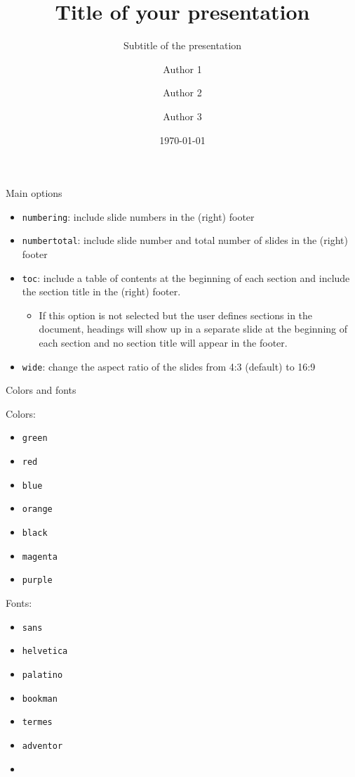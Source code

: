 \documentclass[numbertotal,toc,wide]{../bpslides}
\title{Title of your presentation}
\subtitle{Subtitle of the presentation}
\author{Author 1\inst{1} \and Author 2\inst{2} \and Author 3\inst{3}}
\institute{\inst{1} Institution 1, \  \inst{2} Institution 2, \  \inst{3} Institution 3}
\date{\today}
\begin{document}
\begin{frame}[plain]
	\titlepage
\end{frame}

\begin{frame}{Main options}\label{firstslide}
	\begin{itemize}
		\item \texttt{numbering}: include slide numbers in the (right) footer
		\item \texttt{numbertotal}: include slide number and total number of slides in the (right) footer
		\item \texttt{toc}: include a table of contents at the beginning of each section and include the section title in the (right) footer.
		\begin{itemize}
			\item If this option is not selected but the user defines sections in the document, headings will show up in a separate slide at the beginning of each section and no section title will appear in the footer.
		\end{itemize}
		\item \texttt{wide}: change the aspect ratio of the slides from 4:3 (default) to 16:9
	\end{itemize}
\end{frame}

\begin{frame}{Colors and fonts}
	\hfill
	\begin{minipage}{0.3\textwidth}
		Colors:
		\begin{itemize}
			\item {\color{green0}\texttt{green}} 
			\item {\color{red0}\texttt{red}}
			\item {\color{blue0}\texttt{blue}}
			\item {\color{orange0}\texttt{orange}}
			\item {\color{black}\texttt{black}}
			\item {\color{magenta0}\texttt{magenta}}
			\item {\color{purple0}\texttt{purple}}
		\end{itemize}
	\end{minipage}
	\begin{minipage}{0.3\textwidth}
		Fonts:
		\begin{itemize}
			\item \texttt{sans} 
			\item \texttt{helvetica}
			\item \texttt{palatino}
			\item \texttt{bookman}
			\item \texttt{termes}
			\item \texttt{adventor}
			\item[]
		\end{itemize}
	\end{minipage}
	\hfill \ 
\end{frame}
\end{document}
